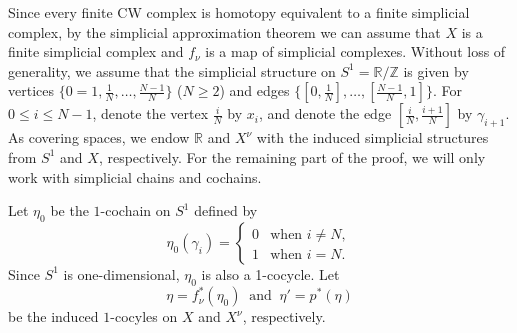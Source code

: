 \documentclass[12pt,leqno,twoside]{amsart}
\theoremstyle{plain}
\theoremstyle{definition}
\newcommand{\R}{\mathbb{R}}
\newcommand{\Z}{\mathbb{Z}}
\begin{document}
Since every finite CW complex is homotopy equivalent to a finite simplicial complex, by the simplicial approximation theorem we can assume that $X$ is a finite simplicial complex and $f_\nu$ is a map of simplicial complexes. Without loss of generality, we assume that the simplicial structure on $S^1=\R/\Z$ is given by vertices $\{0=1, \frac{1}{N}, \ldots, \frac{N-1}{N}\}$ ($N\geq 2$) and edges $\{[0, \frac{1}{N}], \ldots, [\frac{N-1}{N}, 1]\}$. For $0\leq i\leq N-1$, denote the vertex $\frac{i}{N}$ by $x_i$, and denote the edge $[\frac{i}{N}, \frac{i+1}{N}]$ by $\gamma_{i+1}$. As covering spaces, we endow $\R$ and $X^\nu$ with the induced simplicial structures from $S^1$ and $X$, respectively. For the remaining part of the proof, we will only work with simplicial chains and cochains. 

Let $\eta_0$ be the $1$-cochain on $S^1$ defined by 
\begin{equation}\label{circle}
\eta_0(\gamma_i)=
\begin{cases}
0& \text{when } i\neq N,\\
1& \text{when } i= N.
\end{cases}
\end{equation}
Since $S^1$ is one-dimensional, $\eta_0$ is also a 1-cocycle. Let 
\begin{equation}\label{cocycle} \eta=f_\nu^*(\eta_0) \ \text{ and } \ \eta'=p^*(\eta) \end{equation} 
be the induced $1$-cocyles on $X$ and $X^\nu$, respectively. 

\medskip
\end{document}
